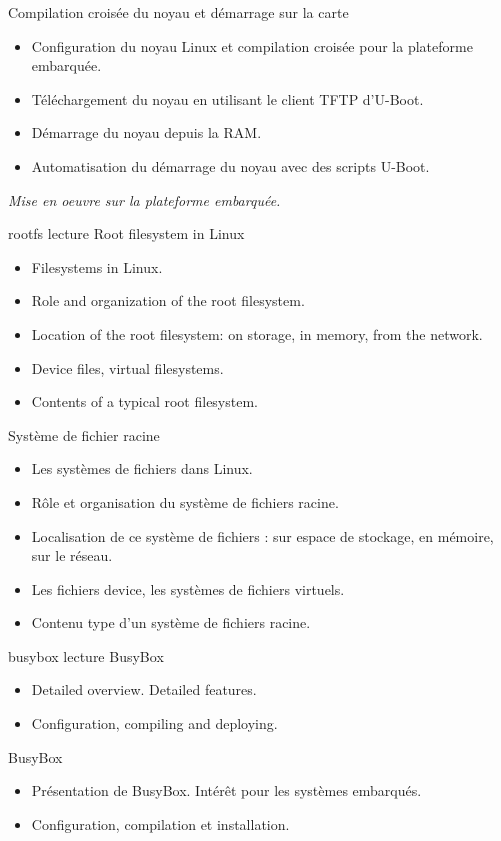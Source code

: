 {Compilation croisée du noyau et démarrage sur la carte}
{
  \begin{itemize}
  \item Configuration du noyau Linux et compilation croisée pour la
    plateforme embarquée.
  \item Téléchargement du noyau en utilisant le client TFTP d'U-Boot.
  \item Démarrage du noyau depuis la RAM.
  \item Automatisation du démarrage du noyau avec des scripts U-Boot.
  \end{itemize}

  \vspace{0.5cm}
  {\em Mise en oeuvre sur la plateforme embarquée.}
}
{rootfs}
{lecture}
{Root filesystem in Linux}
{
  \begin{itemize}
  \item Filesystems in Linux.
  \item Role and organization of the root filesystem.
  \item Location of the root filesystem: on storage, in memory,
        from the network.
  \item Device files, virtual filesystems.
  \item Contents of a typical root filesystem.
  \end{itemize}
}
{Système de fichier racine}
{
  \begin{itemize}
  \item Les systèmes de fichiers dans Linux.
  \item Rôle et organisation du système de fichiers racine.
  \item Localisation de ce système de fichiers : sur espace
	de stockage, en mémoire, sur le réseau.
  \item Les fichiers device, les systèmes de fichiers virtuels.
  \item Contenu type d'un système de fichiers racine.
  \end{itemize}
}
{busybox}
{lecture}
{BusyBox}
{
  \begin{itemize}
  \item Detailed overview. Detailed features.
  \item Configuration, compiling and deploying.
  \end{itemize}
}
{BusyBox}
{
  \begin{itemize}
  \item Présentation de BusyBox. Intérêt pour les systèmes embarqués.
  \item Configuration, compilation et installation.
  \end{itemize}
}
